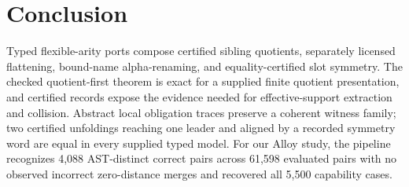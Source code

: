 \section{Conclusion}
\label{sec:conclusion}

Typed flexible-arity ports compose certified sibling quotients, separately
licensed flattening, bound-name alpha-renaming, and equality-certified slot
symmetry.  The checked quotient-first theorem is exact for a supplied finite
quotient presentation, and certified records expose the evidence needed for
effective-support extraction and collision.  Abstract local obligation
traces preserve a coherent witness family; two certified unfoldings reaching
one leader and aligned by a recorded symmetry word are equal in every
supplied typed model.  %
For our Alloy study, the pipeline recognizes 4,088 AST-distinct correct pairs across 61,598 evaluated pairs with no observed incorrect zero-distance merges and recovered all 5,500 capability cases. 


\label{end:main-text}
